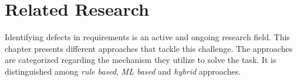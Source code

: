 \chapter{Related Research}
\label{chp:related_research}
Identifying defects in requirements is an active and ongoing research field.
This chapter presents different approaches that tackle this challenge.
The approaches are categorized regarding the mechanism they utilize to solve the task.
It is distinguished among \textit{rule based}, \textit{\ac{ML} based} and \textit{hybrid} approaches. %

% 
